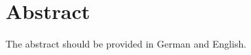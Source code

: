 \documentclass[12pt,a4paper]{article}
\makeatletter
\newcommand{\comment}[1]{ }  %
\newcommand{\insertblankpage}{\mbox{}\thispagestyle{empty}\addtocounter{page}{-1}\newpage}
\renewcommand{\cleardoublepage}{\clearpage\if@twoside \ifodd\c@page\else
  \hbox{}
  \vspace*{\fill}
  \thispagestyle{empty}
  \newpage
  \if@twocolumn\hbox{}\newpage\fi\fi\fi}
\makeatother
\begin{document}
\section*{Abstract}
The abstract should be provided in German and English.


\cleardoublepage
\insertblankpage
\tableofcontents

\comment{

\cleardoublepage
\insertblankpage
\listoffigures

\cleardoublepage
\insertblankpage
\listoftables

\cleardoublepage
\insertblankpage
\section*{List of Symbols}
or


}
\end{document}
